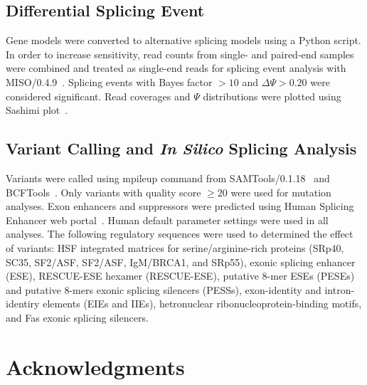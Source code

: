 \documentclass[10pt]{article}
\begin{document}
\subsection{Differential Splicing Event}
Gene models were converted to alternative splicing models using a Python script.
In order to increase sensitivity, read counts from single- and paired-end samples were combined and treated
as single-end reads for splicing event analysis with MISO/0.4.9~\cite{Katz:2010iv}.
Splicing events with Bayes factor $>10$ and $\Delta\Psi>0.20$ were considered significant.
Read coverages and $\Psi$ distributions were plotted using Sashimi plot~\cite{Katz:2013vx}.

\subsection{Variant Calling and \textit{In Silico} Splicing Analysis}
Variants were called using mpileup command from SAMTools/0.1.18~\cite{} and BCFTools~\cite{}.
Only variants with quality score $\ge20$ were used for mutation analyses.
Exon enhancers and suppressors were predicted using Human Splicing Enhancer web portal~\cite{}.
Human default parameter settings were used in all analyses.
The following regulatory sequences were used to determined the effect of variants:
HSF integrated matrices for serine/arginine-rich proteins (SRp40, SC35, SF2/ASF, SF2/ASF,
IgM/BRCA1, and SRp55), exonic splicing enhancer (ESE), RESCUE-ESE hexamer (RESCUE-ESE),
putative 8-mer ESEs (PESEs) and putative 8-mers exonic splicing silencers (PESSs),
exon-identity and intron-identiry elements (EIEs and IIEs), hetronuclear ribonucleoprotein-binding
motifs, and Fas exonic splicing silencers.

\section*{Acknowledgments}

{}
\end{document}
